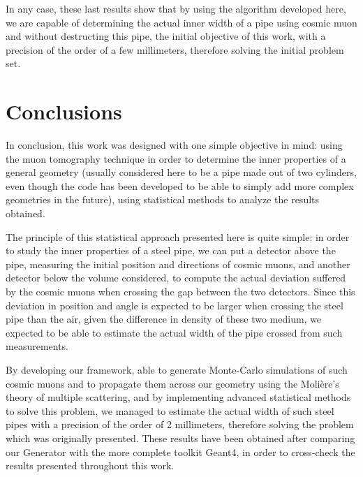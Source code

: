 \documentclass[a4paper, 11pt]{report}
\begin{document}
In any case, these last results show that by using the algorithm developed here, we are capable of determining the actual inner width of a pipe using cosmic muon and without destructing this pipe, the initial objective of this work, with a precision of the order of a few millimeters, therefore solving the initial problem set.


\chapter{Conclusions}

In conclusion, this work was designed with one simple objective in mind: using the muon tomography technique in order to determine the inner properties of a general geometry (usually considered here to be a pipe made out of two cylinders, even though the code has been developed to be able to simply add more complex geometries in the future), using statistical methods to analyze the results obtained.

The principle of this statistical approach presented here is quite simple: in order to study the inner properties of a steel pipe, we can put a detector above the pipe, measuring the initial position and directions of cosmic muons, and another detector below the volume considered, to compute the actual deviation suffered by the cosmic muons when crossing the gap between the two detectors. Since this deviation in position and angle is expected to be larger when crossing the steel pipe than the air, given the difference in density of these two medium, we expected to be able to estimate the actual width of the pipe crossed from such measurements. 

By developing our framework, able to generate Monte-Carlo simulations of such cosmic muons and to propagate them across our geometry using the Moli\`ere's theory of multiple scattering, and by implementing advanced statistical methods to solve this problem, we managed to estimate the actual width of such steel pipes with a precision of the order of 2 millimeters, therefore solving the problem which was originally presented. These results have been obtained after comparing our Generator with the more complete toolkit Geant4, in order to cross-check the results presented throughout this work.
\end{document}
